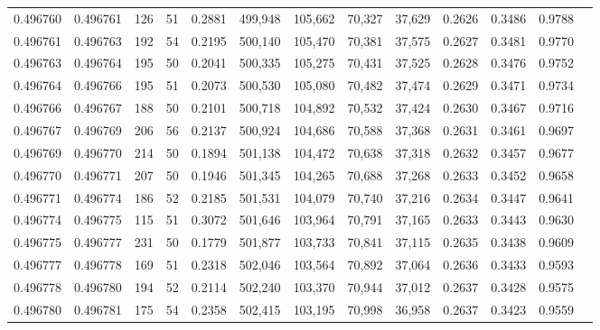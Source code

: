 \begin{tabular}{rrrrrrrrrrrrr}
0.496760 & 0.496761 &   126 &  51 &                                     0.2881 & 499,948 & 105,662 &  70,327 &  37,629 & 0.2626 & 0.3486 & 0.9788 \\
0.496761 & 0.496763 &   192 &  54 &                                     0.2195 & 500,140 & 105,470 &  70,381 &  37,575 & 0.2627 & 0.3481 & 0.9770 \\
0.496763 & 0.496764 &   195 &  50 &                                     0.2041 & 500,335 & 105,275 &  70,431 &  37,525 & 0.2628 & 0.3476 & 0.9752 \\
0.496764 & 0.496766 &   195 &  51 &                                     0.2073 & 500,530 & 105,080 &  70,482 &  37,474 & 0.2629 & 0.3471 & 0.9734 \\
0.496766 & 0.496767 &   188 &  50 &                                     0.2101 & 500,718 & 104,892 &  70,532 &  37,424 & 0.2630 & 0.3467 & 0.9716 \\
0.496767 & 0.496769 &   206 &  56 &                                     0.2137 & 500,924 & 104,686 &  70,588 &  37,368 & 0.2631 & 0.3461 & 0.9697 \\
0.496769 & 0.496770 &   214 &  50 &                                     0.1894 & 501,138 & 104,472 &  70,638 &  37,318 & 0.2632 & 0.3457 & 0.9677 \\
0.496770 & 0.496771 &   207 &  50 &                                     0.1946 & 501,345 & 104,265 &  70,688 &  37,268 & 0.2633 & 0.3452 & 0.9658 \\
0.496771 & 0.496774 &   186 &  52 &                                     0.2185 & 501,531 & 104,079 &  70,740 &  37,216 & 0.2634 & 0.3447 & 0.9641 \\
0.496774 & 0.496775 &   115 &  51 &                                     0.3072 & 501,646 & 103,964 &  70,791 &  37,165 & 0.2633 & 0.3443 & 0.9630 \\
0.496775 & 0.496777 &   231 &  50 &                                     0.1779 & 501,877 & 103,733 &  70,841 &  37,115 & 0.2635 & 0.3438 & 0.9609 \\
0.496777 & 0.496778 &   169 &  51 &                                     0.2318 & 502,046 & 103,564 &  70,892 &  37,064 & 0.2636 & 0.3433 & 0.9593 \\
0.496778 & 0.496780 &   194 &  52 &                                     0.2114 & 502,240 & 103,370 &  70,944 &  37,012 & 0.2637 & 0.3428 & 0.9575 \\
0.496780 & 0.496781 &   175 &  54 &                                     0.2358 & 502,415 & 103,195 &  70,998 &  36,958 & 0.2637 & 0.3423 & 0.9559 \\

\end{tabular}
